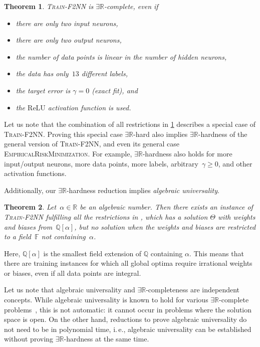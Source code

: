 \documentclass[11pt]{article}
\numberwithin{equation}{section}
\newtheorem{theorem}{Theorem}[section]
\theoremstyle{definition}
\theoremstyle{plain}
\newcommand{\R}{\mathbb R}
\newcommand{\Q}{\mathbb Q}
\newcommand{\ie}{i.\,e.}
\newcommand{\F}{\ensuremath{\mathbb{F}}\xspace}
\newcommand{\ER}{\texorpdfstring{\ensuremath{\exists\R}}{ER}\xspace}
\newcommand{\problemname}[1]{\textnormal{\textsc{#1}}\xspace}
\newcommand{\trainNN}{\problemname{Train-F2NN}}
\newcommand{\ERM}{\problemname{EmpiricalRiskMinimization}}
\newcommand{\ReLU}{\ensuremath{\mathrm{ReLU}}\xspace}
\theoremstyle{plain}
\begin{document}
\begin{theorem}
    \label{thm:er_complete}
    \trainNN is \ER-complete, even if
    \begin{itemize}[nosep]
        \item there are only two input neurons,
        \item there are only two output neurons,
        \item the number of data points is linear in the number of hidden neurons,
        \item the data has only~$13$ different labels,
        \item the target error is $\gamma=0$ 
        (exact fit),
        and
        \item the \ReLU activation function is used.
    \end{itemize}
\end{theorem}

Let us note that the combination of all restrictions in \cref{thm:er_complete} describes a special case of \trainNN.
Proving this special case \ER-hard also implies \ER-hardness of the general version of \trainNN, and even its general case \ERM.
For example, \ER-hardness also holds for more input/output neurons, more data points, more labels, arbitrary~$\gamma \geq 0$, and other activation functions.

Additionally, our \ER-hardness reduction implies \emph{algebraic universality}.

\begin{theorem}
    \label{thm:universality}
    Let~$\alpha \in \R$ be an algebraic number.
    Then there exists an instance of \trainNN fulfilling all the restrictions in , which has a %
solution $\Theta$
with weights and biases %
%
from~$\Q[\alpha]$, but no solution when the weights and biases %
are restricted to a field~$\F$ not containing~$\alpha$.
\end{theorem}

Here, $\Q[\alpha]$ is the smallest field extension of $\Q$ containing $\alpha$. 
This means that there are training instances for which all global optima require irrational weights or biases, even if all data points are integral.

Let us note that algebraic universality and \ER-completeness are independent 
concepts. %
While algebraic universality is known to hold for various \ER-complete 
problems~\cite{Abrahamsen2019_Toolbox}, this is not %
automatic: it  %
cannot occur in problems where the solution space is open.
On the other hand, reductions to prove algebraic universality do not need to be in polynomial
time, \ie, algebraic universality can be established without proving \ER-hardness at the
same time.
\end{document}
